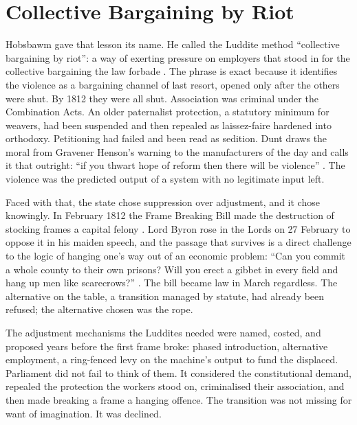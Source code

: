 \section{Collective Bargaining by Riot}

Hobsbawm gave that lesson its name. He called the Luddite method ``collective bargaining by riot'': a way of exerting pressure on employers that stood in for the collective bargaining the law forbade \parencite{Hobsbawm1952}. The phrase is exact because it identifies the violence as a bargaining channel of last resort, opened only after the others were shut. By 1812 they were all shut. Association was criminal under the Combination Acts. An older paternalist protection, a statutory minimum for weavers, had been suspended and then repealed as laissez-faire hardened into orthodoxy. Petitioning had failed and been read as sedition. Dunt draws the moral from Gravener Henson's warning to the manufacturers of the day and calls it that outright: ``if you thwart hope of reform then there will be violence'' \parencite{LynskeyDunt2026Luddites}. The violence was the predicted output of a system with no legitimate input left.

Faced with that, the state chose suppression over adjustment, and it chose knowingly. In February 1812 the Frame Breaking Bill made the destruction of stocking frames a capital felony \parencite{FrameBreakingAct1812}. Lord Byron rose in the Lords on 27 February to oppose it in his maiden speech, and the passage that survives is a direct challenge to the logic of hanging one's way out of an economic problem: ``Can you commit a whole county to their own prisons? Will you erect a gibbet in every field and hang up men like scarecrows?'' \parencite{Byron1812}. The bill became law in March regardless. The alternative on the table, a transition managed by statute, had already been refused; the alternative chosen was the rope.

\begin{keyinsight}[title={Refused, Not Absent by Accident}]
The adjustment mechanisms the Luddites needed were named, costed, and proposed years before the first frame broke: phased introduction, alternative employment, a ring-fenced levy on the machine's output to fund the displaced. Parliament did not fail to think of them. It considered the constitutional demand, repealed the protection the workers stood on, criminalised their association, and then made breaking a frame a hanging offence. The transition was not missing for want of imagination. It was declined.
\end{keyinsight}

